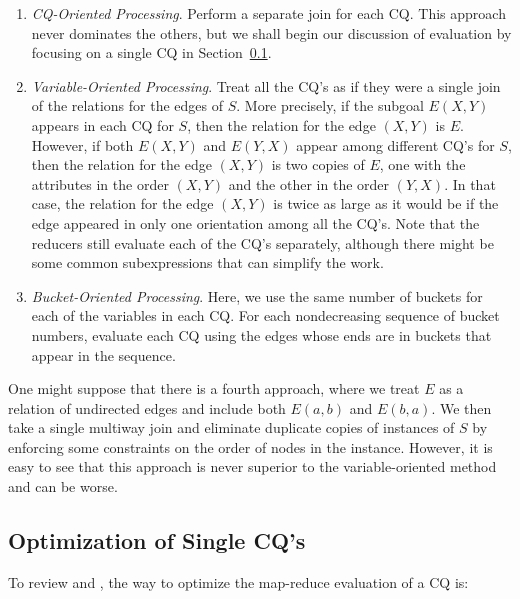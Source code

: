 \begin{enumerate}
\item {\em CQ-Oriented Processing}. Perform a separate join for each CQ.  This approach never dominates the others, but we shall begin our discussion of evaluation by focusing on a single CQ in Section~\ref{1-cq-opt-subsect}.

\item {\em Variable-Oriented Processing}. Treat all the CQ's as if they were a single join of the relations for the edges of $S$.  More precisely, if the subgoal $E(X,Y)$ appears in each CQ for $S$, then the relation for the edge $(X,Y)$ is $E$.  However, if both $E(X,Y)$ and $E(Y,X)$ appear among different CQ's for $S$, then the relation for the edge $(X,Y)$ is two copies of $E$, one with the attributes in the order $(X,Y)$ and the other in the order $(Y,X)$.  In that case, the relation for the edge $(X,Y)$ is twice as large as it would be if the edge appeared in only one orientation among all the CQ's.  Note that the reducers still evaluate each of the CQ's separately, although there might be some common subexpressions that can simplify the work.

\item {\em Bucket-Oriented Processing}. Here, we use the same number of buckets for each of the variables in each CQ. For each nondecreasing sequence of bucket numbers, evaluate each CQ using the edges whose ends are in buckets that appear in the sequence.
\end{enumerate}
One might suppose that there is a fourth approach, where we treat $E$ as a relation of undirected edges and include both $E(a,b)$ and $E(b,a)$.  We then take a single multiway join and eliminate duplicate copies of instances of $S$ by enforcing some constraints on the order of nodes in the instance.  However, it is easy to see that this approach is never superior to the variable-oriented method and can be worse.




\subsection{Optimization of Single CQ's}
\label{1-cq-opt-subsect}

To review \cite{AU10} and \cite{AU11-Datalog2.0}, the way to optimize the map-reduce evaluation of a CQ is:

